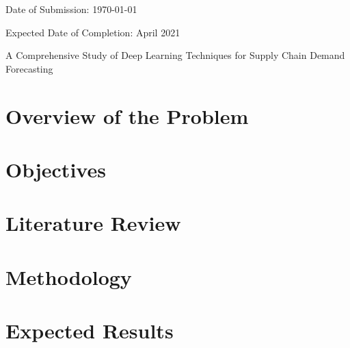 \documentclass[fontsize=11pt,paper=a4]{scrartcl}
\newcommand{\tltle}{A Comprehensive Study of Deep Learning Techniques for Supply Chain Demand Forecasting}
\begin{document}
\begin{spacing}{1}
\begin{titlepage}
\begin{flushleft}
{\begin{minipage}[t]{150pt}
                \end{minipage}
            }

            \vspace{\baselineskip}
            Date of Submission: \today

            \vspace{\baselineskip}
            Expected Date of Completion: April 2021

        \end{flushleft}
    \end{titlepage}
\end{spacing}

\newpage
\maketitle

\newpage
\begin{spacing}{1}
    
\end{spacing}
\newpage


\begin{center}
  \Large \tltle
\end{center}

\vspace{0.3in}
\noindent

\section{Overview of the Problem}
\begin{spacing}{1}
    
\end{spacing}

\section{Objectives}
\begin{spacing}{1}
    
\end{spacing}

\section{Literature Review}
\begin{spacing}{1}
    
\end{spacing}

\section{Methodology}
\begin{spacing}{1}
    
\end{spacing}

\section{Expected Results}
\begin{spacing}{1}
    
\end{spacing}

\printbibliography
\end{document}
